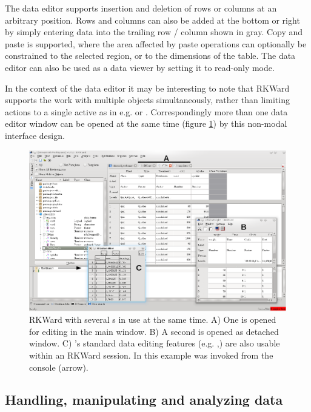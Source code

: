 The data editor supports insertion and deletion of rows or columns at an
arbitrary position. Rows and columns can also be added at the bottom or
right by simply entering data into the trailing row / column shown in
gray. Copy and paste is supported, where the area affected by paste
operations can optionally be constrained to the selected region, or to
the dimensions of the table. The data editor can also be used as a data
viewer by setting it to read-only mode.

In the context of the data editor it may be interesting to note that
RKWard supports the work with multiple objects simultaneously, rather than
limiting actions to a single active  as in e.g.  or
. Correspondingly more than one data editor window can be opened
at the same time (figure \ref{fig:data_editors}) by this non-modal interface design.

\begin{figure}[htp]
 \centering
 \includegraphics{../figures/data_editors.png}
 \caption{RKWard with several s in use at the same time. A) One  is opened for editing in the 
 main window. B) A second  is opened as detached window. C) 's standard data editing features 
(e.g. ,) are also usable within an RKWard session. 
In this example  was invoked from the console (arrow).}
 \label{fig:data_editors}
\end{figure}

\subsection{Handling, manipulating and analyzing data}
\label{sec:analyzing_data}


